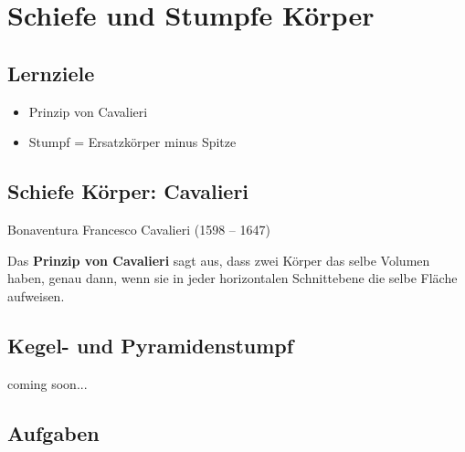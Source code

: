 \section{Schiefe und Stumpfe Körper}


\subsection*{Lernziele}
\begin{itemize}
\item Prinzip von Cavalieri
\item Stumpf = Ersatzkörper minus Spitze
\end{itemize}
\newpage


\subsection{Schiefe Körper: Cavalieri}
Bonaventura Francesco Cavalieri (1598 – 1647)

Das \textbf{Prinzip von Cavalieri} sagt aus, dass zwei Körper das
selbe Volumen haben, genau dann, wenn sie in jeder horizontalen
Schnittebene die selbe Fläche aufweisen.
\newpage


\subsection{Kegel- und Pyramidenstumpf}
coming soon...
\subsection*{Aufgaben}
\newpage

